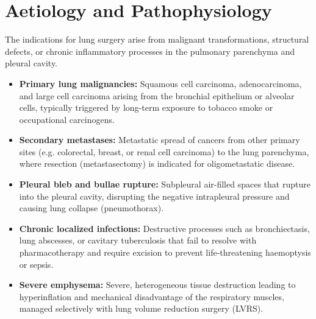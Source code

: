 \section*{Aetiology and Pathophysiology}
The indications for lung surgery arise from malignant transformations, structural defects, or chronic inflammatory processes in the pulmonary parenchyma and pleural cavity.
\begin{itemize}
    \item \textbf{Primary lung malignancies:} Squamous cell carcinoma, adenocarcinoma, and large cell carcinoma arising from the bronchial epithelium or alveolar cells, typically triggered by long-term exposure to tobacco smoke or occupational carcinogens.
    \item \textbf{Secondary metastases:} Metastatic spread of cancers from other primary sites (e.g. colorectal, breast, or renal cell carcinoma) to the lung parenchyma, where resection (metastasectomy) is indicated for oligometastatic disease.
    \item \textbf{Pleural bleb and bullae rupture:} Subpleural air-filled spaces that rupture into the pleural cavity, disrupting the negative intrapleural pressure and causing lung collapse (pneumothorax).
    \item \textbf{Chronic localized infections:} Destructive processes such as bronchiectasis, lung abscesses, or cavitary tuberculosis that fail to resolve with pharmacotherapy and require excision to prevent life-threatening haemoptysis or sepsis.
    \item \textbf{Severe emphysema:} Severe, heterogeneous tissue destruction leading to hyperinflation and mechanical disadvantage of the respiratory muscles, managed selectively with lung volume reduction surgery (LVRS).
\end{itemize}

